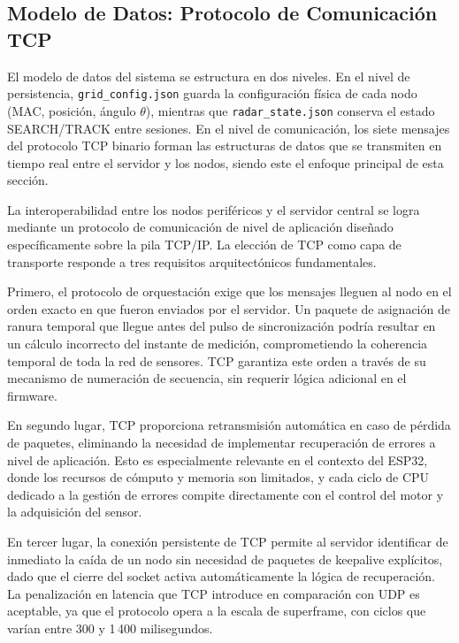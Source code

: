 \subsection{Modelo de Datos: Protocolo de Comunicación TCP}

El modelo de datos del sistema se estructura en dos niveles. En el nivel de persistencia, \texttt{grid\_config.json} guarda la configuración física de cada nodo (MAC, posición, ángulo $\theta$), mientras que \texttt{radar\_state.json} conserva el estado SEARCH/TRACK entre sesiones. En el nivel de comunicación, los siete mensajes del protocolo TCP binario forman las estructuras de datos que se transmiten en tiempo real entre el servidor y los nodos, siendo este el enfoque principal de esta sección.

La interoperabilidad entre los nodos periféricos y el servidor central se logra mediante un protocolo de comunicación de nivel de aplicación diseñado específicamente sobre la pila TCP/IP. La elección de TCP como capa de transporte responde a tres requisitos arquitectónicos fundamentales.

Primero, el protocolo de orquestación exige que los mensajes lleguen al nodo en el orden exacto en que fueron enviados por el servidor. Un paquete de asignación de ranura temporal que llegue antes del pulso de sincronización podría resultar en un cálculo incorrecto del instante de medición, comprometiendo la coherencia temporal de toda la red de sensores. TCP garantiza este orden a través de su mecanismo de numeración de secuencia, sin requerir lógica adicional en el firmware.

En segundo lugar, TCP proporciona retransmisión automática en caso de pérdida de paquetes, eliminando la necesidad de implementar recuperación de errores a nivel de aplicación. Esto es especialmente relevante en el contexto del ESP32, donde los recursos de cómputo y memoria son limitados, y cada ciclo de CPU dedicado a la gestión de errores compite directamente con el control del motor y la adquisición del sensor.

En tercer lugar, la conexión persistente de TCP permite al servidor identificar de inmediato la caída de un nodo sin necesidad de paquetes de keepalive explícitos, dado que el cierre del socket activa automáticamente la lógica de recuperación. La penalización en latencia que TCP introduce en comparación con UDP es aceptable, ya que el protocolo opera a la escala de superframe, con ciclos que varían entre 300 y 1\,400 milisegundos.

